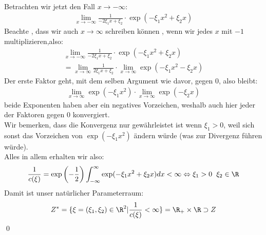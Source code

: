 \documentclass[12pt]{article}
\begin{document}
\begin{description}
{                \\ Betrachten wir jetzt den Fall $x\to-\infty$:
                \begin{align*}
                    \lim_{x\to-\infty}\frac{1}{-2\xi_1x+\xi_2}\cdot\exp(-\xi_1x^2+\xi_2 x)
                \end{align*}
                Beachte , dass wir auch $x\to\infty$ schreiben können , wenn wir jedes $x$ mit $-1$ multiplizieren,also:
                \begin{align*}
                    \lim_{x\to-\infty}\frac{1}{-2\xi_1x+\xi_2}\cdot\exp(-\xi_1x^2+\xi_2 x) \\
                    =\lim_{x\to\infty}\frac{1}{2\xi_1 x+\xi_2}\cdot \lim_{x\to\infty}\exp(-\xi_1x^2-\xi_2x)
                \end{align*}
                Der erste Faktor geht, mit dem selben Argument wie davor, gegen $0$, also bleibt:
                \begin{align*}
                    \lim_{x\to\infty}\exp(-\xi_1x^2)\cdot\lim_{x\to\infty}\exp(-\xi_2x)
                \end{align*}
                beide Exponenten haben aber ein negatives Vorzeichen, weshalb auch hier jeder der Faktoren gegen $0$ konvergiert.
                \\ Wir bemerken, dass die Konvergenz nur gewährleistet ist wenn $\xi_1>0$, weil sich sonst das Vorzeichen von $\exp(-\xi_1 x^2)$ ändern würde (was zur Divergenz führen würde).
                \\ Alles in allem erhalten wir also:
                \begin{align*}
                    \frac{1}{c(\xi)}=\exp\left(-\frac{1}{2}\right)\int_{-\infty}^{\infty}\exp(-\xi_1x^2+\xi_2 x)dx<\infty
                    \Leftrightarrow \xi_1>0 \hspace{2mm} \xi_2\in\R
                \end{align*}
                Damit ist unser natürlicher Parameterraum:
                \begin{align*}
                    Z^*=\{\xi=(\xi_1,\xi_2)\in\R^2|\frac{1}{c(\xi)}<\infty\}=\R_{+}\times\R\supset Z
                \end{align*}
                \xtab \qed\\\\\\
                }
        \end{description}
\end{document}

